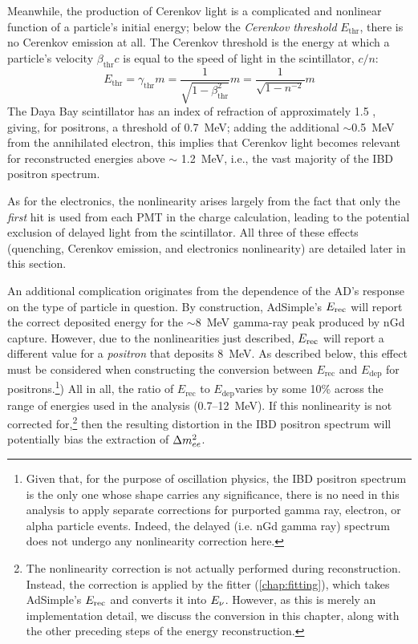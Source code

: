 \documentclass[../thesis.tex]{subfiles}
\begin{document}
Meanwhile, the production of Cerenkov light is a complicated and nonlinear function of a particle's initial energy; below the \emph{Cerenkov threshold} $E_{\mathrm{thr}}$, there is no Cerenkov emission at all. The Cerenkov threshold is the energy at which a particle's velocity $\beta_{\mathrm{thr}} c$ is equal to the speed of light in the scintillator, $c/n$:
\begin{equation}
  E_{\mathrm{thr}} = \gamma_{\mathrm{thr}} m = \frac{1}{\sqrt{1 - \beta^2_{\mathrm{thr}}}} m = \frac{1}{\sqrt{1 - n^{-2}}} m
\end{equation}
The Daya Bay scintillator has an index of refraction of approximately 1.5 \cite{Band:2012dh}, giving, for positrons, a threshold of 0.7~MeV; adding the additional $\sim$0.5~MeV from the annihilated electron, this implies that Cerenkov light becomes relevant for reconstructed energies above $\sim$ 1.2~MeV, i.e., the vast majority of the IBD positron spectrum.

As for the electronics, the nonlinearity arises largely from the fact that only the \emph{first} hit is used from each PMT in the charge calculation, leading to the potential exclusion of delayed light from the scintillator. All three of these effects (quenching, Cerenkov emission, and electronics nonlinearity) are detailed later in this section.

An additional complication originates from the dependence of the AD's response on the type of particle in question. By construction, AdSimple's $E_\mathrm{rec}$ will report the correct deposited energy for the $\sim$8~MeV gamma-ray peak produced by nGd capture. However, due to the nonlinearities just described, $E_\mathrm{rec}$ will report a different value for a \emph{positron} that deposits 8~MeV. As described below, this effect must be considered when constructing the conversion between $E_{\mathrm{rec}}$ and $E_{\mathrm{dep}}$ for positrons.\footnote{Given that, for the purpose of oscillation physics, the IBD positron spectrum is the only one whose shape carries any significance, there is no need in this analysis to apply separate corrections for purported gamma ray, electron, or alpha particle events. Indeed, the delayed (i.e. nGd gamma ray) spectrum does not undergo any nonlinearity correction here.}) All in all, the ratio of $E_{\mathrm{rec}}$ to $E_{\mathrm{dep}} $varies by some 10\% across the range of energies used in the analysis (0.7--12~MeV). If this nonlinearity is not corrected for,\footnote{The nonlinearity correction is not actually performed during reconstruction. Instead, the correction is applied by the fitter (\autoref{chap:fitting}), which takes AdSimple's $E_\mathrm{rec}$ and converts it into $E_\mathrm{\nu}$. However, as this is merely an implementation detail, we discuss the conversion in this chapter, along with the other preceding steps of the energy reconstruction.} then the resulting distortion in the IBD positron spectrum will potentially bias the extraction of $\Delta m^2_{ee}$.
\end{document}
